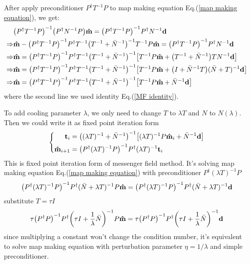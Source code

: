 \documentclass[11pt, letterpaper]{article}
\newcommand{\vbd}{\vb{d}}
\newcommand{\inv}[1]{#1^{-1}}
\newcommand{\hatm}{\vb{\hat{m}}}
\newcommand{\Pdagger}{P^{\dagger}}
\newcommand{\Nbar}{\bar{N}}
\newcommand{\PPinv}[1]{\inv{\qty(\Pdagger #1 P)}}
\begin{document}
After apply preconditioner $\Pdagger \inv{T} P$ to map making equation
Eq.(\ref{map making equation}), we get:
\begin{align}
\begin{aligned}[b]
\mathrel{\phantom{\Rightarrow}}
&\PPinv{\inv{T}} \qty(\Pdagger \inv{N} P) \hatm
= \PPinv{\inv{T}} \Pdagger \inv{N} \vbd
\\ \Rightarrow
&\hatm - \PPinv{\inv{T}} \Pdagger \inv{T} 
    \inv{\qty(\inv{T}+\inv{\Nbar})} \inv{T} P\hatm
= \PPinv{\inv{T}} \Pdagger \inv{N} \vbd
\\ \Rightarrow
& \hatm = \PPinv{\inv{T}} \Pdagger \inv{T} \inv{\qty(\inv{T} + \inv{\Nbar})} 
    \qty[ \inv{T}P\hatm + \qty(\inv{T}+\inv{\Nbar}) T \inv{N}\vbd]
\\ \Rightarrow
& \hatm = \PPinv{\inv{T}} \Pdagger \inv{T} \inv{\qty(\inv{T} + \inv{\Nbar})} 
    \qty[ \inv{T}P\hatm + \qty(I+\inv{\Nbar}T) \inv{(\Nbar + T)}\vbd]
\\ \Rightarrow
& \hatm = \PPinv{\inv{T}} \Pdagger \inv{T} 
    \inv{\qty(\inv{T} + \inv{\Nbar})} \qty[ \inv{T}P\hatm + \inv{\Nbar}\vbd]
\end{aligned}
\end{align}
where the second line we used identity Eq.(\ref{MF identity}).

To add cooling parameter $\lambda$, we only need to change $T$ to $\lambda T$
and $N$ to $N(\lambda)$.
Then we could  write it as fixed point iteration form
\begin{equation}
\left\{\!
\begin{aligned}
\vb{t}_i &= \inv{\qty(\inv{(\lambda T)} + \inv{\Nbar})} 
    \qty[ \inv{(\lambda T)}P\hatm_i + \inv{\Nbar}\vbd]\\
\hatm_{i+1} &= \PPinv{\inv{(\lambda T)}} \Pdagger \inv{(\lambda T)} \vb{t}_i 
\end{aligned}
\right.
\end{equation}
This is fixed point iteration form of messenger field method.
It's solving map making equation Eq.(\ref{map making equation}) with
preconditioner $\Pdagger \inv{(\lambda T)} P$
\begin{align}
\PPinv{\inv{(\lambda T)}} \Pdagger \inv{(\Nbar + \lambda T)} P \hatm
= \PPinv{\inv{(\lambda T)}} \Pdagger \inv{(\Nbar + \lambda T)} \vbd
\end{align}
substitute $T = \tau I$ 
\begin{align}
\tau \PPinv{} \Pdagger \inv{\qty(\tau I + \frac{1}{\lambda}\Nbar)} P \hatm 
= \tau \PPinv{} \Pdagger \inv{\qty(\tau I + \frac{1}{\lambda}\Nbar)} \vbd
\label{lambda eta equiv}
\end{align}
since multiplying a constant won't change the condition number, it's equivalent
to solve map making equation with perturbation parameter $\eta = 1/\lambda$ and
simple preconditioner.
\end{document}
